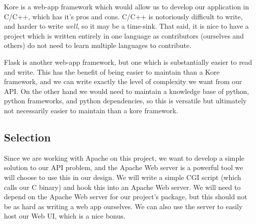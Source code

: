 Kore is a web-app framework which would allow us to develop our application in C/C++, which has it's pros and cons.
C/C++ is notoriously difficult to write, and harder to write \textit{well}, so it may be a time-sink.
That said, it is nice to have a project which is written entirely in one language as contributors (ourselves and others) do not need to learn multiple languages to contribute.

Flask is another web-app framework, but one which is substantially easier to read and write.
This has the benefit of being easier to maintain than a Kore framework, and we can write exactly the level of complexity we want from our API.
On the other hand we would need to maintain a knowledge base of python, python frameworks, and python dependencies, so this is versatile but ultimately not necessarily easier to maintain than a kore framework.

\subsection{Selection}

Since we are working with Apache on this project, we want to develop a simple solution to our API problem, and the Apache Web server is a powerful tool we will choose to use this in our design.
We will write a simple CGI script (which calls our C binary) and hook this into an Apache Web server.
We will need to depend on the Apache Web server for our project's package, but this should not be as hard as writing a web app ourselves.
We can also use the server to easily host our Web UI, which is a nice bonus.
